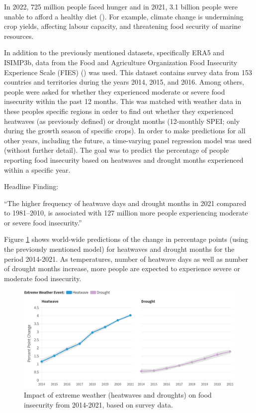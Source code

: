 \documentclass[
]{krantz}
\begin{document}
In 2022, 725 million people faced hunger and in 2021, 3.1 billion people were unable to afford a healthy diet (\citet{noauthor_2023-jt}). For example, climate change is undermining crop yields, affecting labour capacity, and threatening food security of marine resources.

In addition to the previously mentioned datasets, specifically ERA5 and ISIMP3b, data from the Food and Agriculture Organization Food Insecurity Experience Scale (FIES) (\citet{CAFIERO2018146}) was used. This dataset contains survey data from 153 countries and territories during the years 2014, 2015, and 2016. Among others, people were asked for whether they experienced moderate or severe food insecurity within the past 12 months. This was matched with weather data in these peoples specific regions in order to find out whether they experienced heatwaves (as previously defined) or drought months (12-monthly SPEI; only during the growth season of specific crops). In order to make predictions for all other years, including the future, a time-varying panel regression model was used (without further detail). The goal was to predict the percentage of people reporting food insecurity based on heatwaves and drought months experienced within a specific year.

Headline Finding:

``The higher frequency of heatwave days and drought months in 2021 compared to 1981--2010, is associated with 127 million more people experiencing moderate or severe food insecurity.''

Figure \ref{fig:food1strobl} shows world-wide predictions of the change in percentage points (using the previously mentioned model) for heatwaves and drought months for the period 2014-2021. As temperatures, number of heatwave days as well as number of drought months increase, more people are expected to experience severe or moderate food insecurity.

\begin{figure}
\includegraphics[width=1\linewidth]{work/08-lancet/figures/indicator_3_1} \caption{Impact of extreme weather (heatwaves and droughts) on food insecurity from 2014-2021, based on survey data.}\label{fig:food1strobl}
\end{figure}
\end{document}
